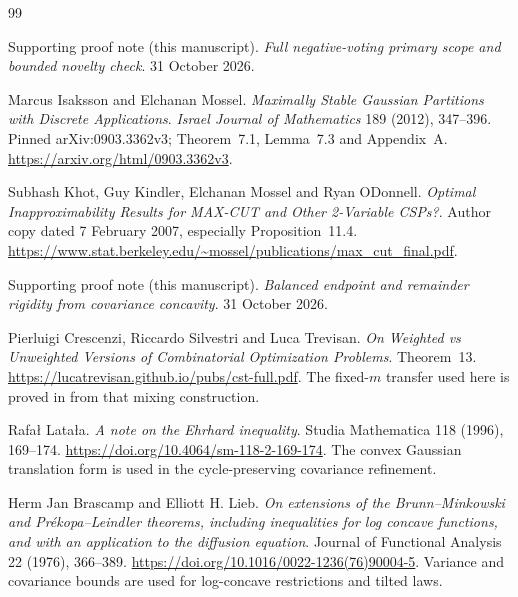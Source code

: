 \begin{thebibliography}{99}

Supporting proof note (this manuscript). \emph{Full negative-voting primary scope and bounded novelty check}. 31 October 2026.

\par{}




Marcus Isaksson and Elchanan Mossel. \emph{Maximally Stable Gaussian Partitions with Discrete Applications}. \emph{Israel Journal of Mathematics} 189 (2012), 347--396. Pinned arXiv:0903.3362v3; Theorem~7.1, Lemma~7.3 and Appendix~A. \url{https://arxiv.org/html/0903.3362v3}.






Subhash Khot, Guy Kindler, Elchanan Mossel and Ryan O\textquotesingle Donnell. \emph{Optimal Inapproximability Results for MAX-CUT and Other 2-Variable CSPs?}. Author copy dated 7 February 2007, especially Proposition~11.4. \url{https://www.stat.berkeley.edu/~mossel/publications/max_cut_final.pdf}.






Supporting proof note (this manuscript). \emph{Balanced endpoint and remainder rigidity from covariance concavity}. 31 October 2026.
\par{}


Pierluigi Crescenzi, Riccardo Silvestri and Luca Trevisan.
\emph{On Weighted vs Unweighted Versions of Combinatorial Optimization Problems}.
Theorem~13. \url{https://lucatrevisan.github.io/pubs/cst-full.pdf}.
 The fixed-$m$ transfer used here is proved
in \cite[Section~4]{transfer} from that mixing construction.




Rafa\l{} Lata\l{}a. \emph{A note on the Ehrhard inequality}.
Studia Mathematica 118 (1996), 169--174.
\url{https://doi.org/10.4064/sm-118-2-169-174}.
 The convex Gaussian translation form is
used in the cycle-preserving covariance refinement.

Herm Jan Brascamp and Elliott H. Lieb.
\emph{On extensions of the Brunn--Minkowski and Pr\'ekopa--Leindler
 theorems, including inequalities for log concave functions, and with
 an application to the diffusion equation}.
Journal of Functional Analysis 22 (1976), 366--389.
\url{https://doi.org/10.1016/0022-1236(76)90004-5}.
 Variance and covariance bounds are used
for log-concave restrictions and tilted laws.


\end{thebibliography}
